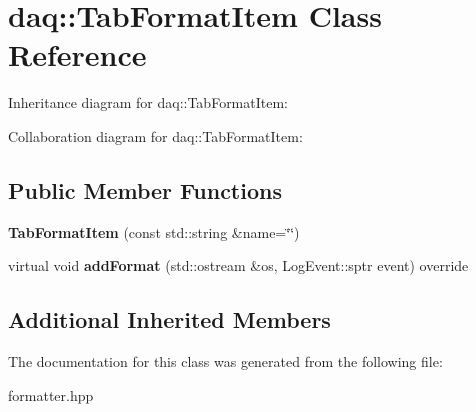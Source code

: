 \hypertarget{classdaq_1_1TabFormatItem}{}\section{daq\+:\+:Tab\+Format\+Item Class Reference}
\label{classdaq_1_1TabFormatItem}


Inheritance diagram for daq\+:\+:Tab\+Format\+Item\+:


Collaboration diagram for daq\+:\+:Tab\+Format\+Item\+:
\subsection*{Public Member Functions}
\begin{DoxyCompactItemize}
\item 
\mbox{\label{classdaq_1_1TabFormatItem_a9cdb9b077d518a1cad83f49f660b97a2}} 
{\bfseries Tab\+Format\+Item} (const std\+::string \&name=\char`\"{}\char`\"{})
\item 
\mbox{\label{classdaq_1_1TabFormatItem_a41ed7237bb62b95df641b0abb0a0879b}} 
virtual void {\bfseries add\+Format} (std\+::ostream \&os, Log\+Event\+::sptr event) override
\end{DoxyCompactItemize}
\subsection*{Additional Inherited Members}


The documentation for this class was generated from the following file\+:\begin{DoxyCompactItemize}
\item 
formatter.\+hpp\end{DoxyCompactItemize}
